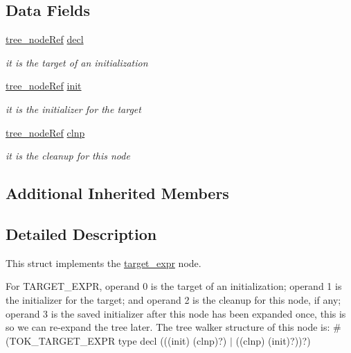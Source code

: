 \subsection*{Data Fields}
\begin{DoxyCompactItemize}
\item 
\hyperlink{tree__node_8hpp_a6ee377554d1c4871ad66a337eaa67fd5}{tree\+\_\+node\+Ref} \hyperlink{structtarget__expr_a017095d8f477d1afbc7032d381d172ef}{decl}
\begin{DoxyCompactList}\small\item\em it is the target of an initialization \end{DoxyCompactList}\item 
\hyperlink{tree__node_8hpp_a6ee377554d1c4871ad66a337eaa67fd5}{tree\+\_\+node\+Ref} \hyperlink{structtarget__expr_adc1b8734f1761bd4e9e6feaa3a845bbc}{init}
\begin{DoxyCompactList}\small\item\em it is the initializer for the target \end{DoxyCompactList}\item 
\hyperlink{tree__node_8hpp_a6ee377554d1c4871ad66a337eaa67fd5}{tree\+\_\+node\+Ref} \hyperlink{structtarget__expr_ac80460d67150bc8145a6469172292d12}{clnp}
\begin{DoxyCompactList}\small\item\em it is the cleanup for this node \end{DoxyCompactList}\end{DoxyCompactItemize}
\subsection*{Additional Inherited Members}


\subsection{Detailed Description}
This struct implements the \hyperlink{structtarget__expr}{target\+\_\+expr} node. 

For T\+A\+R\+G\+E\+T\+\_\+\+E\+X\+PR, operand 0 is the target of an initialization; operand 1 is the initializer for the target; and operand 2 is the cleanup for this node, if any; operand 3 is the saved initializer after this node has been expanded once, this is so we can re-\/expand the tree later. The tree walker structure of this node is\+: \#(T\+O\+K\+\_\+\+T\+A\+R\+G\+E\+T\+\_\+\+E\+X\+PR type decl (((init) (clnp)?) $\vert$ ((clnp) (init)?))?) 

